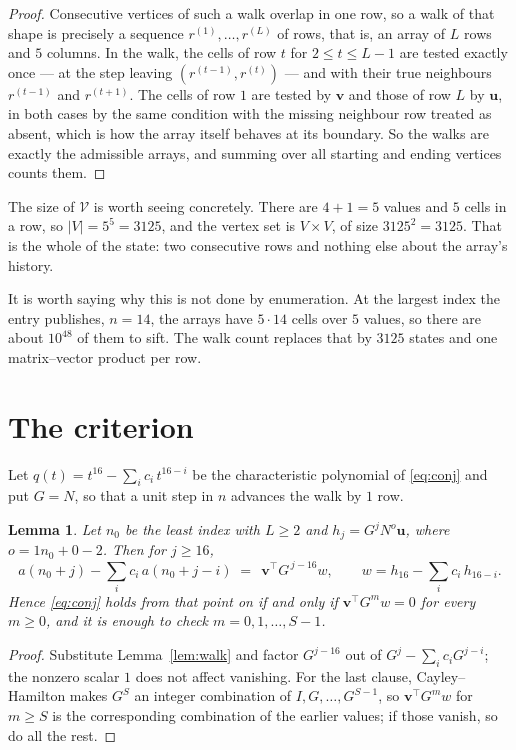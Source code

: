 \documentclass[11pt,a4paper]{article}
\theoremstyle{plain}
\newtheorem{lemma}[theorem]{Lemma}
\theoremstyle{definition}
\begin{document}
\begin{proof}
Consecutive vertices of such a walk overlap in one row, so a walk of that shape is
precisely a sequence $r^{(1)},\dots,r^{(L)}$ of rows, that is, an array of $L$ rows
and $5$ columns. In the walk, the cells of row $t$ for $2\le t\le L-1$ are tested
exactly once --- at the step leaving $(r^{(t-1)},r^{(t)})$ --- and with their true
neighbours $r^{(t-1)}$ and $r^{(t+1)}$. The cells of row $1$ are tested by
$\mathbf{v}$ and those of row $L$ by $\mathbf{u}$, in both cases by the same condition
with the missing neighbour row treated as absent, which is how the array itself behaves at
its boundary. So the walks are exactly the admissible arrays, and summing over all starting
and ending vertices counts them.
\end{proof}


The size of $\mathcal V$ is worth seeing concretely. There are $4+1=5$ values
and $5$ cells in a row, so $|V|=5^{5}=3125$, and the vertex set is
$V\times V$, of size $3125^2=3125$. That is the whole of the state: two consecutive
rows and nothing else about the array's history.

It is worth saying why this is not done by enumeration. At the largest index the entry
publishes, $n=14$, the arrays have $5\cdot14$ cells over
$5$ values, so there are about $10^{48}$ of them to sift. The
walk count replaces that by $3125$ states and one matrix--vector product per row.
\section{The criterion}

Let $q(t)=t^{16}-\sum_i c_i\,t^{16-i}$ be the characteristic polynomial of
\eqref{eq:conj} and put $G=N$, so that a unit step in $n$ advances the walk by
$1$ row.

\begin{lemma}\label{lem:crit}
Let $n_0$ be the least index with $L\ge2$ and $h_j=G^{j}N^{o}\mathbf{u}$, where
$o=1n_0+0-2$. Then for $j\ge16$,
\[
a(n_0+j)-\sum_i c_i\,a(n_0+j-i)\;=\;\,\mathbf{v}^{\!\top}G^{\,j-16}w,
\qquad w=h_{16}-\sum_i c_i\,h_{16-i} .
\]
Hence \eqref{eq:conj} holds from that point on if and only if
$\mathbf{v}^{\!\top}G^{m}w=0$ for every $m\ge0$, and it is enough to check
$m=0,1,\dots,S-1$.
\end{lemma}

\begin{proof}
Substitute Lemma~\ref{lem:walk} and factor $G^{j-16}$ out of
$G^{j}-\sum_ic_iG^{j-i}$; the nonzero scalar $1$ does not affect
vanishing. For the last clause, Cayley--Hamilton makes $G^{S}$ an integer combination of
$I,G,\dots,G^{S-1}$, so $\mathbf{v}^{\!\top}G^{m}w$ for $m\ge S$ is the corresponding
combination of the earlier values; if those vanish, so do all the rest.
\end{proof}
\end{document}
